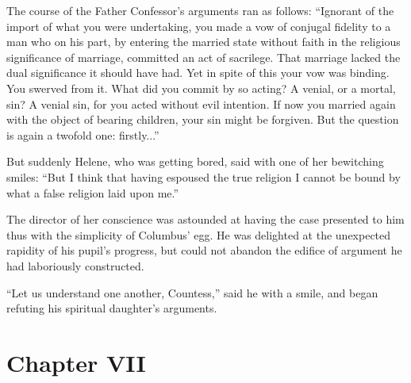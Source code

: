 The course of the Father Confessor's arguments ran as follows:
``Ignorant of the import of what you were undertaking, you made a
vow of conjugal fidelity to a man who on his part, by entering
the married state without faith in the religious significance of
marriage, committed an act of sacrilege. That marriage lacked the
dual significance it should have had. Yet in spite of this your
vow was binding. You swerved from it.  What did you commit by so
acting? A venial, or a mortal, sin? A venial sin, for you acted
without evil intention. If now you married again with the object
of bearing children, your sin might be forgiven. But the question
is again a twofold one: firstly...''

But suddenly Helene, who was getting bored, said with one of her
bewitching smiles: ``But I think that having espoused the true
religion I cannot be bound by what a false religion laid upon
me.''

The director of her conscience was astounded at having the case
presented to him thus with the simplicity of Columbus' egg. He
was delighted at the unexpected rapidity of his pupil's progress,
but could not abandon the edifice of argument he had laboriously
constructed.

``Let us understand one another, Countess,'' said he with a
smile, and began refuting his spiritual daughter's arguments.


\chapter*{Chapter VII} \ifaudio {}
\fi

